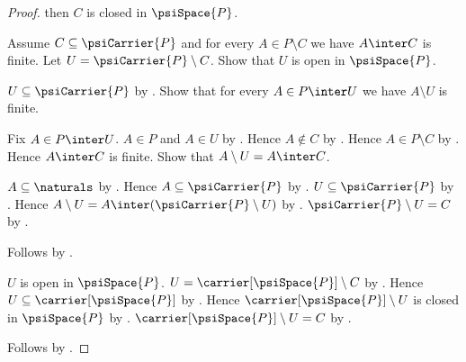 \begin{proof}
        then $C$ is closed in $\psiSpace{P}$.
    \begin{subproof}
        Assume $C\subseteq\psiCarrier{P}$ and
            for every $A\in P\setminus C$ we have $A\inter C$ is finite.
        Let $U=\psiCarrier{P}\setminus C$.
        Show that $U$ is open in $\psiSpace{P}$.
        \begin{subproof}
            $U\subseteq\psiCarrier{P}$ by .
            Show that for every $A\in P\inter U$ we have
                $A\setminus U$ is finite.
            \begin{subproof}
                Fix $A\in P\inter U$.
                $A\in P$ and $A\in U$ by .
                Hence $A\notin C$ by .
                Hence $A\in P\setminus C$ by .
                Hence $A\inter C$ is finite.
                Show that $A\setminus U=A\inter C$.
                \begin{subproof}
                    $A\subseteq\naturals$ by
                        .
                    Hence $A\subseteq\psiCarrier{P}$ by
                        .
                    $U\subseteq\psiCarrier{P}$
                        by .
                    Hence $A\setminus U=
                        A\inter(\psiCarrier{P}\setminus U)$
                        by .
                    $\psiCarrier{P}\setminus U=C$
                        by .
                \end{subproof}
            \end{subproof}
            Follows by .
        \end{subproof}
        $U$ is open in $\psiSpace{P}$.
        $U=\carrier[\psiSpace{P}]\setminus C$
            by .
        Hence $U\subseteq\carrier[\psiSpace{P}]$
            by .
        Hence $\carrier[\psiSpace{P}]\setminus U$ is closed in
            $\psiSpace{P}$ by .
        $\carrier[\psiSpace{P}]\setminus U=C$
            by
            .
    \end{subproof}
    Follows by \auto.
\end{proof}

